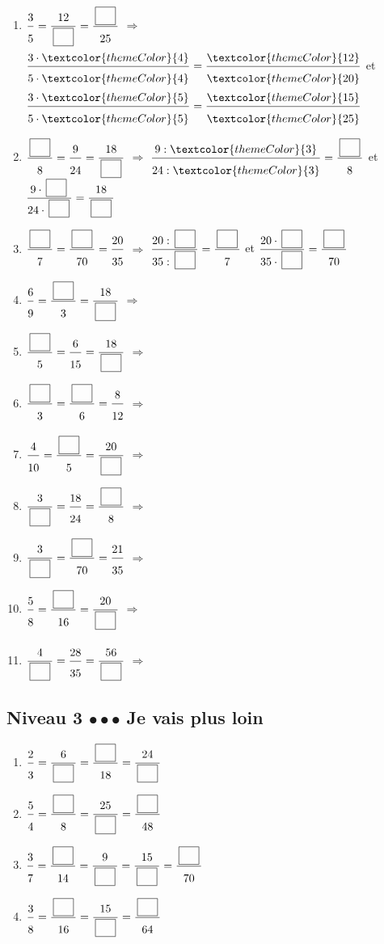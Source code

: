 \begin{enumerate}[leftmargin=*,align=parleft, label=\alph*), itemsep=9pt]
\item $\FA{3}{5}=\FA{12}{\CaseC}=\FA{\CaseC}{25}$ \quad $\Longrightarrow$ \quad $\FA{3 \cdot \textcolor{themeColor}{4}}{5 \cdot \textcolor{themeColor}{4}}=\FA{\textcolor{themeColor}{12}}{\textcolor{themeColor}{20}}$ \quad et \quad $\FA{3 \cdot \textcolor{themeColor}{5}}{5 \cdot \textcolor{themeColor}{5}}=\FA{\textcolor{themeColor}{15}}{\textcolor{themeColor}{25}}$
\item $\FA{\CaseC}{8}=\FA{9}{24}=\FA{18}{\CaseC}$ \quad $\Longrightarrow$ \quad $\FA{9 : \textcolor{themeColor}{3}}{24 : \textcolor{themeColor}{3}}=\FA{\CaseC}{8}$ \quad et \quad $\FA{9 \cdot \CaseC}{24 \cdot \CaseC}=\FA{18}{\CaseC}$
\item $\FA{\CaseC}{7}=\FA{\CaseC}{70}=\FA{20}{35}$ \quad $\Longrightarrow$ \quad $\FA{20 : \CaseC}{35 : \CaseC}=\FA{\CaseC}{7}$ \quad et \quad $\FA{20 \cdot \CaseC}{35 \cdot \CaseC}=\FA{\CaseC}{70}$
\item $\FA{6}{9}=\FA{\CaseC}{3}=\FA{18}{\CaseC}$ \quad $\Longrightarrow$
\item $\FA{\CaseC}{5}=\FA{6}{15}=\FA{18}{\CaseC}$ \quad $\Longrightarrow$
\item $\FA{\CaseC}{3}=\FA{\CaseC}{6}=\FA{8}{12}$ \quad $\Longrightarrow$
\item $\FA{4}{10}=\FA{\CaseC}{5}=\FA{20}{\CaseC}$ \quad $\Longrightarrow$
\item $\FA{3}{\CaseC}=\FA{18}{24}=\FA{\CaseC}{8}$ \quad $\Longrightarrow$
\item $\FA{3}{\CaseC}=\FA{\CaseC}{70}=\FA{21}{35}$ \quad $\Longrightarrow$
\item $\FA{5}{8}=\FA{\CaseC}{16}=\FA{20}{\CaseC}$ \quad $\Longrightarrow$
\item $\FA{4}{\CaseC}=\FA{28}{35}=\FA{56}{\CaseC}$ \quad $\Longrightarrow$
\end{enumerate}
 
\newpage
\subsection{Niveau 3 \quad $\bullet\bullet\bullet$ \quad Je vais plus loin}
 
 
\begin{enumerate}[leftmargin=*,align=parleft, label=\alph*), itemsep=9pt]
\item $\FA{2}{3}=\FA{6}{\CaseC}=\FA{\CaseC}{18}=\FA{24}{\CaseC}$
\item $\FA{5}{4}=\FA{\CaseC}{8}=\FA{25}{\CaseC}=\FA{\CaseC}{48}$
\item $\FA{3}{7}=\FA{\CaseC}{14}=\FA{9}{\CaseC}=\FA{15}{\CaseC}=\FA{\CaseC}{70}$
\item $\FA{3}{8}=\FA{\CaseC}{16}=\FA{15}{\CaseC}=\FA{\CaseC}{64}$
\end{enumerate}
 

